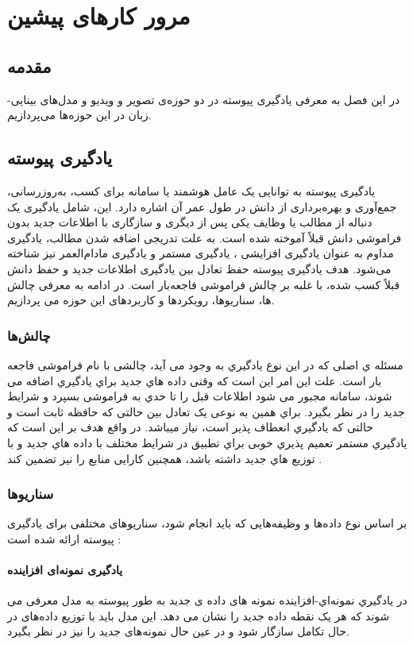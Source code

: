 \chapter{مرور کارهای پیشین}
\section{مقدمه}
در این فصل به معرفی یادگیری پیوسته در دو حوزه‌ی تصویر و ویدیو و مدل‌های بینایی-زبان در این حوزه‌ها می‌پردازیم. 

\section{یادگیری پیوسته}
یادگیری پیوسته به توانایی یک عامل هوشمند یا سامانه برای کسب، به‌روزرسانی، جمع‌آوری و بهره‌برداری از دانش در طول عمر آن اشاره دارد. این، شامل یادگیری یک دنباله از مطالب یا وظایف یکی پس از دیگری و سازگاری با اطلاعات جدید بدون فراموشی دانش قبلاً آموخته شده است. به علت تدریجی اضافه شدن مطالب، یادگیری مداوم به عنوان یادگیری افزایشی ، یادگیری مستمر  و یادگیری مادام‌العمر  نیز شناخته می‌شود. هدف یادگیری پیوسته حفظ تعادل بین یادگیری اطلاعات جدید و حفظ دانش قبلاً کسب شده، با غلبه بر چالش فراموشی فاجعه‌بار است. در ادامه به معرفی چالش ها، سناریوها، رویکردها و کاربردهای این حوزه می پردازیم.

\subsection{چالش‌ها}
مسئله ي اصلی که در این نوع یادگیري به وجود می آید، چالشی با نام فراموشی فاجعه بار است. علت این امر این است که وقتی داده هاي جدید براي یادگیري اضافه می شوند، سامانه مجبور می شود اطلاعات قبل را تا حدي به فراموشی بسپرد و شرایط جدید را در نظر بگیرد. براي همین به نوعی یک تعادل بین حالتی که حافظه ثابت است و حالتی که یادگیري انعطاف پذیر است، نیاز میباشد. در واقع هدف بر این است که یادگیري مستمر تعمیم پذیري خوبی براي تطبیق در شرایط مختلف با داده هاي جدید و با توزیع هاي جدید داشته باشد، همچنین کارایی منابع را نیز تضمین کند 
\cite{1, 2}
.
\subsection{سناریوها}
بر اساس نوع داده‌ها و وظیفه‌هایی که باید انجام شود، سناریوهای مختلفی برای یادگیری پیوسته ارائه شده است 
\cite{1}:
\subsubsection{یادگیری نمونه‌ای افزاینده}
در یادگیري نمونه‌اي-افزاینده 
نمونه های داده ی جدید به طور پیوسته به مدل معرفی می شوند که هر یک نقطه داده جدید را نشان می دهد. این مدل باید با توزیع داده‌های در حال تکامل سازگار شود و در عین حال نمونه‌های جدید را نیز در نظر بگیرد.
